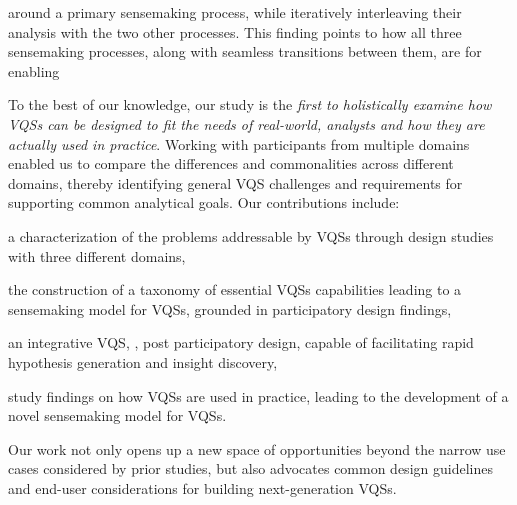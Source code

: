  \par {} around a primary sensemaking process, while iteratively interleaving their analysis with the two other processes. This finding points to how all three sensemaking processes, along with seamless transitions between them, are  for enabling %
 \par To the best of our knowledge, our study is the \emph{first to holistically examine how VQSs can be designed to fit the needs of real-world, analysts and how they are actually used in practice}. Working with participants from multiple domains enabled us to compare the differences and commonalities across different domains, thereby identifying general VQS challenges and requirements for supporting common analytical goals. Our contributions include:
 \begin{denselist}
 \item a characterization of the problems addressable by VQSs through design studies with three different domains,
 \item the construction of a taxonomy of essential VQSs capabilities leading to a sensemaking model for VQSs, grounded in participatory design findings, %
 \item an integrative VQS, \zvpp, post participatory design, capable of facilitating rapid hypothesis generation and insight discovery,
 \item study findings on how VQSs are used in practice, leading to the development of a novel sensemaking model for VQSs. %
 \end{denselist}
 Our work not only opens up a new space of opportunities beyond the narrow use cases considered by prior studies, but also advocates common design guidelines and end-user considerations for building next-generation VQSs.